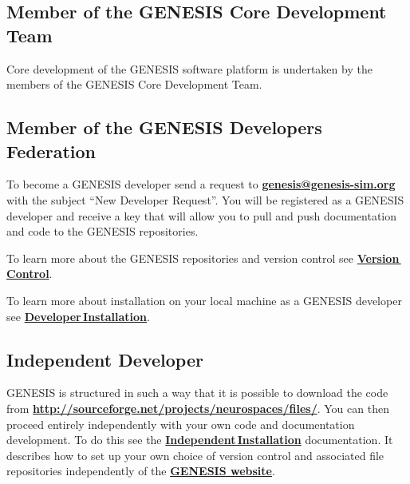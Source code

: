 \documentclass[12pt]{article}
\begin{document}
\subsection*{Member of the GENESIS Core Development Team}

Core development of the GENESIS software platform is undertaken by the members of the GENESIS Core Development Team.

\subsection*{Member of the GENESIS Developers Federation}

To become a GENESIS developer send a request to \href{mailto:genesis@genesis-sim.org}{\bf genesis@genesis-sim.org} with the subject ``New Developer Request''. You will be registered as a GENESIS developer and receive a key that will allow you to pull and push documentation and code to the GENESIS repositories.

To learn more about the GENESIS repositories and version control see \href{../version-control/version-control.tex}{\bf Version\,Control}.
	
To learn more about installation on your local machine as a GENESIS developer see \href{../installation-developer/installation-developer.tex}{\bf Developer\,Installation}.

\subsection*{\bf Independent Developer}

GENESIS is structured in such a way that it is possible to download the code from \href{http://sourceforge.net/projects/neurospaces/files/}{\bf http://sourceforge.net/projects/neurospaces/files/}. You can then proceed entirely independently with your own code and documentation development. To do this see the \href{../installation-independent/installation-independent.tex}{\bf Independent\,Installation} documentation. It describes how to set up your own choice of version control and associated file repositories independently of the \href{http://www.genesis-sim.org/}{\bf GENESIS website}.



\end{document}
